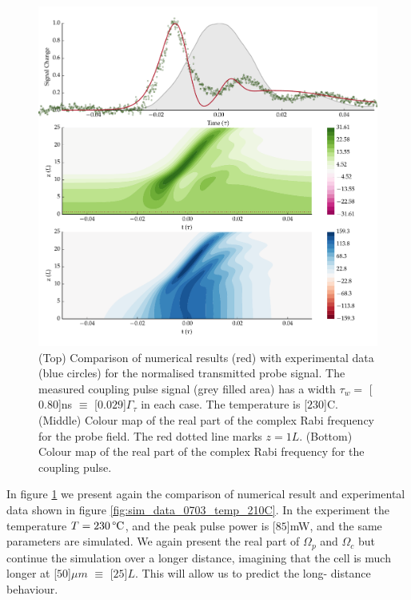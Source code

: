     \begin{figure}[h]
      \includegraphics[width=\linewidth]
        {figs/06_simultons/mb_vee2g_15c_130p_0330t_230C_sb50_120vel010_10_050um_fig1.pdf}
      \caption{
      (Top) Comparison of numerical results (red) with experimental data (blue
      circles) for the normalised transmitted probe signal. The measured coupling
      pulse signal (grey filled area) has a width $\tau_w = $ \unit[$0.80$]{ns} $
      \equiv $ \unit[$0.029$]{$\Gamma_\tau$} in each case. The temperature is
      \unit[$230$]{\textdegree C}. (Middle) Colour map of the real part of the
      complex Rabi frequency for the probe field. The red dotted line marks $z =
      1L$. (Bottom) Colour map of the real part of the complex Rabi frequency for
      the coupling pulse.
      } 
      \label{fig:exp_result_single} 
    \end{figure}

    In figure \ref{fig:exp_result_single} we present again the comparison of
    numerical result and experimental data shown in figure
    \ref{fig:sim_data_0703_temp_210C}. In the experiment the temperature $T =
    \unit[230]{\textrm{\textdegree C}}$, and the peak pulse power is
    \unit[$85$]{mW}, and the same parameters are simulated. We again present the
    real part of $\Omega_p$ and $\Omega_c$ but continue the simulation over a
    longer distance, imagining that the cell is much longer at \unit[$50$]{$\mu
    m$} $ \equiv$ \unit[$25$]{$L$}. This will allow us to predict the long-
    distance behaviour.

